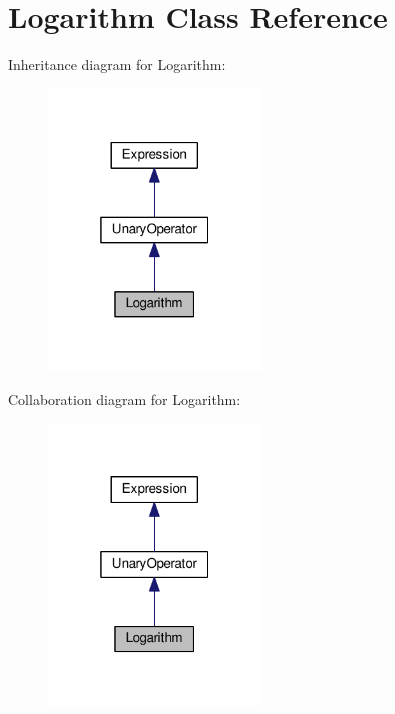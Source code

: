 \hypertarget{classLogarithm}{}\section{Logarithm Class Reference}
\label{classLogarithm}


Inheritance diagram for Logarithm\+:\nopagebreak
\begin{figure}[H]
\begin{center}
\leavevmode
\includegraphics[width=160pt]{classLogarithm__inherit__graph}
\end{center}
\end{figure}


Collaboration diagram for Logarithm\+:\nopagebreak
\begin{figure}[H]
\begin{center}
\leavevmode
\includegraphics[width=160pt]{classLogarithm__coll__graph}
\end{center}
\end{figure}
